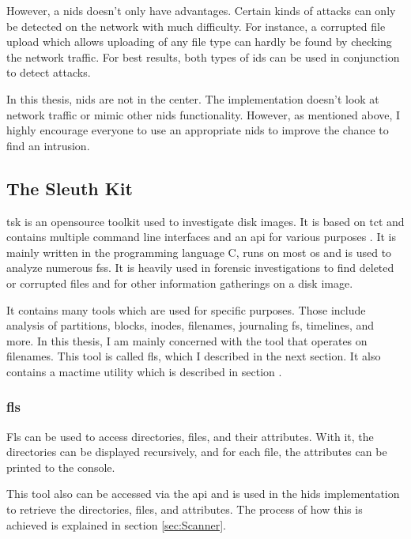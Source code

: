 However, a \gls{nids} doesn't only have advantages. Certain kinds of attacks can only be detected on the network with much difficulty. For instance, a corrupted file upload which allows uploading of any file type can hardly be found by checking the network traffic. For best results, both types of \gls{ids} can be used in conjunction to detect attacks. 

In this thesis, \gls{nids} are not in the center. The implementation doesn't look at network traffic or mimic other \gls{nids} functionality. However, as mentioned above, I highly encourage everyone to use an appropriate \gls{nids} to improve the chance to find an intrusion. 

\subsection{The Sleuth Kit}
\label{sec:tsk}

\gls{tsk} is an \gls{opensource} toolkit used to investigate disk images. It is based on \gls{tct} \cite{tct} and contains multiple command line interfaces and an \gls{api} for various purposes \cite{tsk, tsk:about}. It is mainly written in the programming language C, runs on most \gls{os} and is used to analyze numerous \glspl{fs}. It is heavily used in forensic investigations to find deleted or corrupted files and for other information gatherings on a disk image.

It contains many tools which are used for specific purposes. Those include analysis of partitions, blocks, inodes, filenames, journaling \gls{fs}, timelines, and more. In this thesis, I am mainly concerned with the tool that operates on filenames. This tool is called fls, which I described in the next section. It also contains a mactime utility which is described in section .

\subsubsection{fls}
\label{sec:fls}

Fls can be used to access directories, files, and their attributes. With it, the directories can be displayed recursively, and for each file, the attributes can be printed to the console. \cite{tsk:fls} 

This tool also can be accessed via the \gls{api} and is used in the \gls{hids} implementation to retrieve the directories, files, and attributes. The process of how this is achieved is explained in section \ref{sec:Scanner}.

